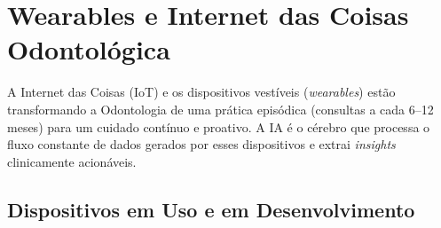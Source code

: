 
\section{Wearables e Internet das Coisas Odontológica}
\label{sec:wearables-iot}

\nivelquatro

A Internet das Coisas (IoT) e os dispositivos vestíveis (\textit{wearables})
estão transformando a Odontologia de uma prática episódica (consultas a cada
6--12 meses) para um cuidado contínuo e proativo. A IA é o cérebro que processa
o fluxo constante de dados gerados por esses dispositivos e extrai
\textit{insights} clinicamente acionáveis.

 

\subsection{Dispositivos em Uso e em Desenvolvimento}

